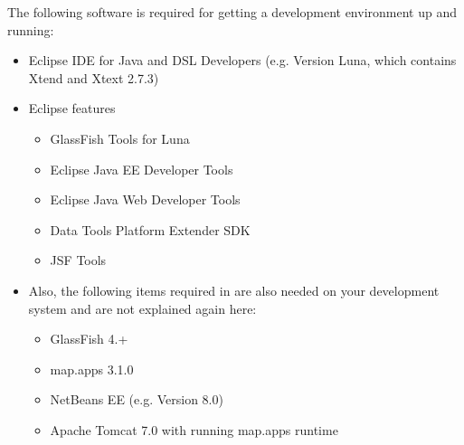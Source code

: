 
The following software is required for getting a development environment up and running:

\begin{itemize}
\item Eclipse IDE for Java and DSL Developers (e.g. Version Luna, which contains Xtend and Xtext 2.7.3)
\item Eclipse features
\begin{itemize}
	\item GlassFish Tools for Luna
	\item Eclipse Java EE Developer Tools
	\item Eclipse Java Web Developer Tools
	\item Data Tools Platform Extender SDK
	\item JSF Tools
\end{itemize}
\item Also, the following items required in  are also needed on your development system and are not explained again here:
\begin{itemize}
	\item GlassFish 4.+
	\item map.apps 3.1.0
	\item NetBeans EE (e.g. Version 8.0)
	\item Apache Tomcat 7.0 with running map.apps runtime
\end{itemize}
\end{itemize}





